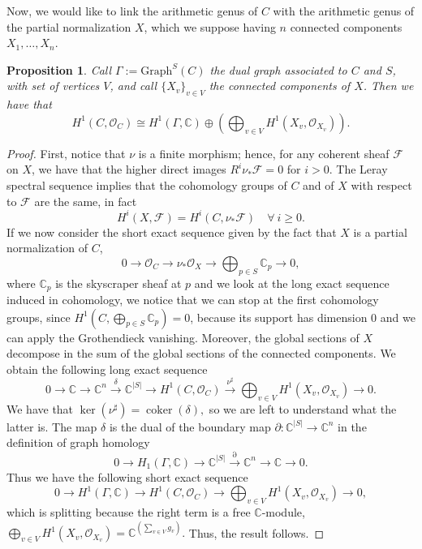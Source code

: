 \documentclass[a4paper,12 pt,titlepage,twoside]{book}
\newcommand{\numberset}{\mathbb}
\newcommand{\C}{\numberset{C}}
\newcommand{\os}{\mathcal{O}}
\DeclareMathOperator{\coker}{coker}
\theoremstyle{plain}
\theoremstyle{theorem}
\newtheorem{prop}[thm]{Proposition}
\theoremstyle{definition}
\theoremstyle{remark}
\begin{document}
	Now, we would like to link the arithmetic genus of $C$ with the arithmetic genus of the partial normalization $X$, which we suppose having $n$ connected components $X_1,\dots,X_n$.
	\begin{prop}\label{relation C with G and N}
		Call $\Gamma := \text{Graph}^S(C)$ the dual graph associated to $C$ and $S$, with set of vertices $V$, and call $\{X_v\}_{v \in V}$ the connected components of $X$. Then we have that $$H^1(C,\os_C) \cong H^1(\Gamma,\C) \oplus \left(\bigoplus_{v \in V} H^1(X_v, \os_{X_v})\right).$$ 
	\end{prop}
	\begin{proof}
		First, notice that $\nu$ is a finite morphism; hence, for any coherent sheaf $\mathcal{F}$ on $X$, we have that the higher direct images $R^i\nu_*\mathcal{F} =0$ for $i >0.$ The Leray spectral sequence implies that the cohomology groups of $C$ and of $X$ with respect to $\mathcal{F}$ are the same, in fact $$H^i(X,\mathcal{F})= H^i(C,\nu_*\mathcal{F}) \quad \forall \ i \ge 0.$$ If we now consider the short exact sequence given by the fact that $X$ is a partial normalization of $C$, $$0 \rightarrow \os_C \rightarrow \nu_*\os_X \rightarrow \bigoplus_{p \in S} \C_p \rightarrow 0,$$ where $\C_p$ is the skyscraper sheaf at $p$ and we look at the long exact sequence induced in cohomology, we notice that 
		we can stop at the first cohomology groups, since $H^1(C, \bigoplus_{p \in S} \C_p) =0$, because its support has dimension 0 and we can apply the Grothendieck vanishing. Moreover, the global sections of $X$ decompose in the sum of the global sections of the connected components. We obtain the following long exact sequence $$0 \rightarrow \C \rightarrow \C^n \stackrel{\delta}{\longrightarrow} \C^{|S|} \rightarrow H^1(C,\os_C) \stackrel{\nu^\sharp}{\longrightarrow} \bigoplus_{v \in V}H^1(X_v,\os_{X_v}) \rightarrow 0.$$ We have that $\ker(\nu^\sharp) = \coker(\delta),$ so we are left to understand what the latter is. The map $\delta$ is the dual of the boundary map $\partial \colon \C^{|S|} \rightarrow \C^n$ in the definition of graph homology $$0 \rightarrow H_1(\Gamma, \C) \rightarrow \C^{|S|} \stackrel{\partial}{\longrightarrow} \C^n \rightarrow \C \rightarrow 0.$$ Thus we have the following short exact sequence \begin{equation}\label{eq: H1 exact sequence} 0 \rightarrow H^1(\Gamma, \C) \rightarrow H^1(C,\os_C) \rightarrow \bigoplus_{v \in V} H^1(X_v, \os_{X_v}) \rightarrow 0,\end{equation} which is splitting because the right term is a free $\C$-module, $\bigoplus_{v \in V} H^1(X_v, \os_{X_v}) = \C^{\left(\sum_{v \in V} g_v\right)}.$ Thus, the result follows.
	\end{proof}
\end{document}
